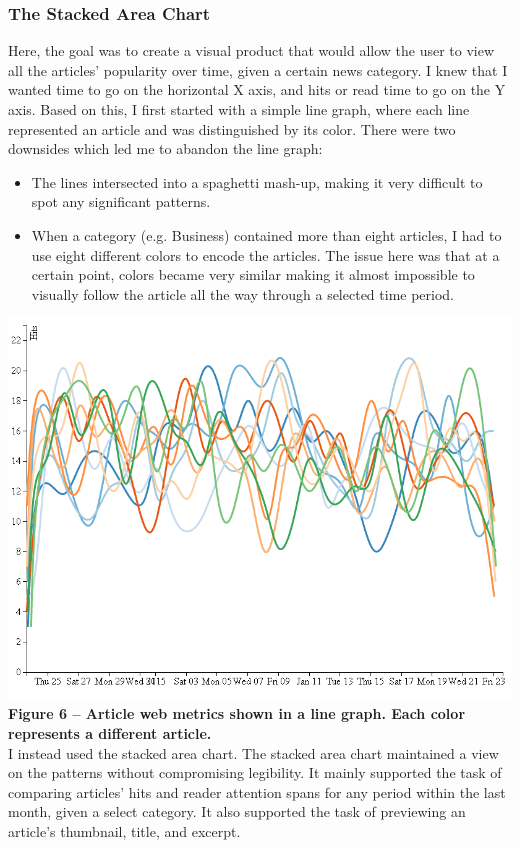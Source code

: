 \documentclass[12pt]{article}
\begin{document}
{\subsubsection{The Stacked Area Chart}

Here, the goal was to create a visual product that would allow the user to view all the articles' popularity over time, given a certain news category. I knew that I wanted time to go on the horizontal X axis, and hits or read time to go on the Y axis. Based on this, I first started with a simple line graph, where each line represented an article and was distinguished by its color. There were two downsides which led me to abandon the line graph: 
\begin{itemize}
\item The lines intersected into a spaghetti mash-up, making it very difficult to spot any significant patterns.
\item When a category (e.g. Business) contained more than eight articles, I had to use eight different colors to encode the articles. The issue here was that at a certain point, colors became very similar making it almost impossible to visually follow the article all the way through a selected time period.
\end{itemize}

\noindent\includegraphics[scale=0.65]{img/lines} \\
\noindent\textbf{Figure 6 -- Article web metrics shown in a line graph. Each color represents a different article.} \\ 

\noindent I instead used the stacked area chart. The stacked area chart maintained a view on the patterns without compromising legibility. It mainly supported the task of comparing articles' hits and reader attention spans for any period within the last month, given a select category. It also supported the task of previewing an article's thumbnail, title, and excerpt.

}
\end{document}

